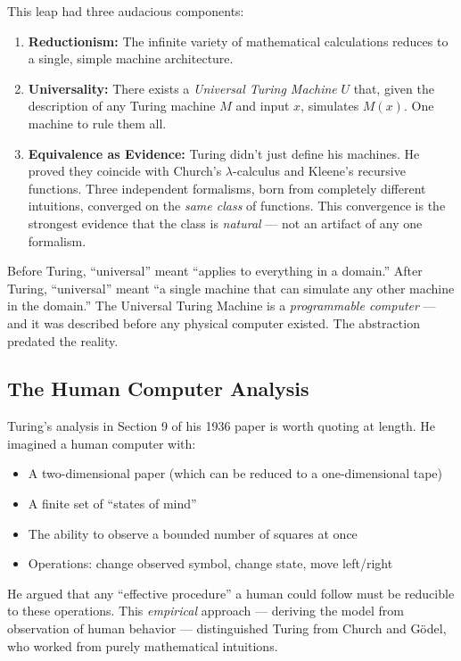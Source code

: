 This leap had three audacious components:

\begin{enumerate}
\item \textbf{Reductionism:} The infinite variety of mathematical calculations reduces to a single, simple machine architecture.

\item \textbf{Universality:} There exists a \emph{Universal Turing Machine} $U$ that, given the description of any Turing machine $M$ and input $x$, simulates $M(x)$. One machine to rule them all.

\item \textbf{Equivalence as Evidence:} Turing didn't just define his machines. He proved they coincide with Church's $\lambda$-calculus and Kleene's recursive functions. Three independent formalisms, born from completely different intuitions, converged on the \emph{same class} of functions. This convergence is the strongest evidence that the class is \emph{natural} --- not an artifact of any one formalism.
\end{enumerate}

Before Turing, ``universal'' meant ``applies to everything in a domain.'' After Turing, ``universal'' meant ``a single machine that can simulate any other machine in the domain.'' The Universal Turing Machine is a \emph{programmable computer} --- and it was described before any physical computer existed. The abstraction predated the reality.

\subsection*{The Human Computer Analysis}

Turing's analysis in Section 9 of his 1936 paper is worth quoting at length. He imagined a human computer with:
\begin{itemize}
\item A two-dimensional paper (which can be reduced to a one-dimensional tape)
\item A finite set of ``states of mind''
\item The ability to observe a bounded number of squares at once
\item Operations: change observed symbol, change state, move left/right
\end{itemize}

He argued that any ``effective procedure'' a human could follow must be reducible to these operations. This \emph{empirical} approach --- deriving the model from observation of human behavior --- distinguished Turing from Church and G\"odel, who worked from purely mathematical intuitions.

